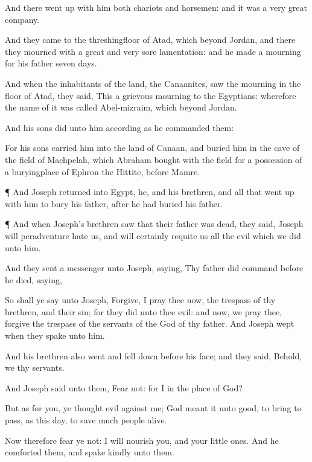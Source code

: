 {And there went
up with him both
chariots and
horsemen: and it was a
very
great
company.

And they
came to the
threshingfloor of
Atad, which
{}
beyond
Jordan, and there they
mourned with a
great and
very
sore
lamentation: and he
made a
mourning for his
father
seven
days.

And when the
inhabitants of the
land, the
Canaanites,
saw the
mourning in the
floor of
Atad, they
said, This
{} a
grievous
mourning to the
Egyptians: wherefore the name of
it was
called
Abel-mizraim, which
{}
beyond
Jordan.

And his
sons
did unto him according as he
commanded them:

For his
sons
carried him into the
land of
Canaan, and
buried him in the
cave of the
field of
Machpelah, which
Abraham
bought with the
field for a
possession of a
buryingplace of
Ephron the
Hittite,
before
Mamre.


\par }{\PP {}¶ And
Joseph
returned into
Egypt, he, and his
brethren, and all that went
up with him to
bury his
father,
after he had
buried his
father.


\par }{\PP {}¶ And when
Joseph’s
brethren
saw that their
father was
dead, they
said,
Joseph will
peradventure hate
us, and will
certainly
requite us all the
evil which we
did unto him.

And they sent a
messenger unto
Joseph,
saying, Thy
father did
command
before he
died,
saying,

So shall ye
say unto
Joseph,
Forgive, I pray
thee now, the
trespass of thy
brethren, and their
sin; for they
did unto thee
evil: and now, we pray thee,
forgive the
trespass of the
servants of the
God of thy
father. And
Joseph
wept when they
spake unto him.

And his
brethren also
went and fell
down before his
face; and they
said, Behold, we
{} thy
servants.

And
Joseph
said unto them,
Fear not: for
{} I in the place of
God?

But as for you, ye
thought
evil against me;
{}
God meant
it unto
good,
to bring to
pass, as
{} this
day, to
save
much
people
alive.

Now therefore
fear ye not: I will
nourish you, and your little
ones. And he
comforted them, and
spake
kindly unto them.


}
